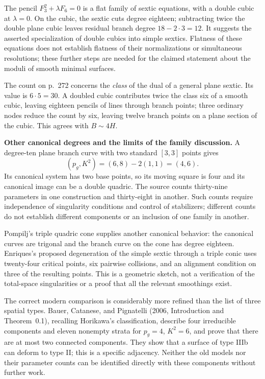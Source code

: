 The pencil \(F_3^2+\lambda F_6=0\) is a flat family of sextic equations, with a double cubic at \(\lambda=0\). On the cubic, the sextic cuts degree eighteen; subtracting twice the double plane cubic leaves residual branch degree \(18-2\cdot3=12\). It suggests the asserted specialization of double cubics into simple sextics. Flatness of these equations does not establish flatness of their normalizations or simultaneous resolutions; these further steps are needed for the claimed statement about the moduli of smooth minimal surfaces.

The count on p.~272 concerns the \emph{class} of the dual of a general plane sextic. Its value is \(6\cdot5=30\). A doubled cubic contributes twice the class six of a smooth cubic, leaving eighteen pencils of lines through branch points; three ordinary nodes reduce the count by six, leaving twelve branch points on a plane section of the cubic. This agrees with \(B\sim4H\).

\textbf{Other canonical degrees and the limits of the family discussion.}
A degree-ten plane branch curve with two standard \([3,3]\) points gives
\[
(p_g,K^2)=(6,8)-2(1,1)=(4,6).
\]
Its canonical system has two base points, so its moving square is four and its canonical image can be a double quadric. The source counts thirty-nine parameters in one construction and thirty-eight in another. Such counts require independence of singularity conditions and control of stabilizers; different counts do not establish different components or an inclusion of one family in another.

Pompilj's triple quadric cone supplies another canonical behavior: the canonical curves are trigonal and the branch curve on the cone has degree eighteen. Enriques's proposed degeneration of the simple sextic through a triple conic uses twenty-four critical points, six pairwise collisions, and an alignment condition on three of the resulting points. This is a geometric sketch, not a verification of the total-space singularities or a proof that all the relevant smoothings exist.

The correct modern comparison is considerably more refined than the list of three spatial types. Bauer, Catanese, and Pignatelli (2006, Introduction and Theorem~0.1), recalling Horikawa's classification, describe four irreducible components and eleven nonempty strata for \(p_g=4\), \(K^2=6\), and prove that there are at most two connected components. They show that a surface of type IIIb can deform to type II; this is a specific adjacency. Neither the old models nor their parameter counts can be identified directly with these components without further work.

